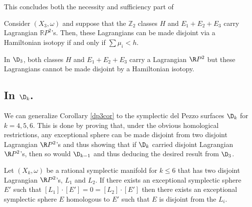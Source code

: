 This concludes both the necessity and sufficiency part of

\begin{Theorem}\label{tworp2thrm}
Consider $(X_3,\omega)$ and suppose that the $\mathbb{Z}_2$ classes $H$ and $E_1+E_2+E_3$ carry Lagrangian $\mathbb{R}P^2$'s. Then, these Lagrangians can be made disjoint via a Hamiltonian isotopy if and only if $\sum\mu_i<h$.  
\end{Theorem}

\begin{corollary}\label{dp3cor}
In $\D_3$, both classes $H$ and $E_1+E_2+E_3$ carry a Lagrangian $\R P^2$ but these Lagrangians cannot be made disjoint by a Hamiltonian isotopy.
\end{corollary}
















\subsection{In $\D_k$.}

We can generalize Corollary \ref{dp3cor} to the symplectic del Pezzo surfaces $\D_k$ for $k=4,5,6$. This is done by proving that, under the obvious homological restrictions, any exceptional sphere can be made disjoint from two disjoint Lagrangian $\R P^2$'s and thus showing that if $\D_k$ carried disjoint Lagrangian $\R P^2$'s, then so would $\D_{k-1}$ and thus deducing the desired result from $\D_3$.\par 




\begin{lemma}\label{inductionstep}
Let $(X_k,\omega)$ be a rational symplectic manifold for $k\leq 6$ that has two disjoint Lagrangian $\R P^2$'s, $L_1$ and $L_2$. If there exists an exceptional symplectic sphere $E'$ such that $[L_1]\cdot [E']=0=[L_2]\cdot [E']$ then there exists an exceptional symplectic sphere $E$ homologous to $E'$ such that $E$ is disjoint from the $L_i$.
\end{lemma}

